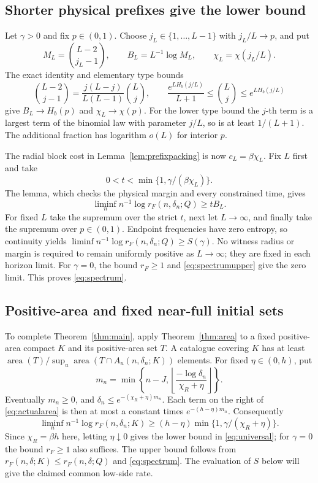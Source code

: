 \documentclass[11pt]{amsart}
\theoremstyle{definition}
\theoremstyle{remark}
\newcommand{\area}{\operatorname{area}}
\numberwithin{equation}{section}
\begin{document}
\subsection{Shorter physical prefixes give the lower bound}
Let $\gamma>0$ and fix $p\in(0,1)$.
Choose $j_L\in\{1,\ldots,L-1\}$ with $j_L/L\to p$, and put
\[
M_L=\binom{L-2}{j_L-1},\qquad
B_L=L^{-1}\log M_L,\qquad \chi_L=\chi(j_L/L).
\]
The exact identity and elementary type bounds
\[
\binom{L-2}{j-1}=\frac{j(L-j)}{L(L-1)}\binom Lj,\qquad
\frac{e^{LH_b(j/L)}}{L+1}\le\binom Lj\le e^{LH_b(j/L)}
\]
give $B_L\to H_b(p)$ and $\chi_L\to\chi(p)$.
For the lower type bound the $j$-th term is a largest term of
the binomial law with parameter $j/L$, so is at least $1/(L+1)$.
The additional fraction has logarithm $o(L)$ for interior $p$.

The radial block cost in Lemma~\ref{lem:prefixpacking} is now
$c_L=\beta\chi_L$. Fix $L$ first and take
\begin{equation}\label{eq:prefixratio}
0<t<\min\{1,\gamma/(\beta\chi_L)\}.
\end{equation}
The lemma, which checks the physical margin and every constrained
time, gives
\begin{equation}\label{eq:prefixlower}
\liminf_n n^{-1}\log r_F(n,\delta_n;Q)\ge tB_L.
\end{equation}
For fixed $L$ take the supremum over the strict $t$, next let
$L\to\infty$, and finally take the supremum over $p\in(0,1)$.
Endpoint frequencies have zero entropy, so continuity yields
$\liminf n^{-1}\log r_F(n,\delta_n;Q)\ge S(\gamma)$.
No witness radius or margin is required to remain uniformly positive
as $L\to\infty$; they are fixed in each horizon limit.
For $\gamma=0$, the bound $r_F\ge1$ and
\eqref{eq:spectrumupper} give the zero limit.
This proves \eqref{eq:spectrum}.

\subsection{Positive-area and fixed near-full initial sets}
To complete Theorem~\ref{thm:main}, apply Theorem~\ref{thm:area}
to a fixed positive-area compact $K$ and its positive-area set $T$.
A catalogue covering $K$ has at least
$\area(T)/\sup_u\area(T\cap A_u(n,\delta_n;K))$ elements.
For fixed $\eta\in(0,h)$, put
\[
m_n=\min\left\{n-J,
 \left\lfloor\frac{-\log\delta_n}{\chi_R+\eta}\right\rfloor\right\}.
\]
Eventually $m_n\ge0$, and
$\delta_n\le e^{-(\chi_R+\eta)m_n}$.
Each term on the right of \eqref{eq:actualarea} is then at most
a constant times $e^{-(h-\eta)m_n}$. Consequently
\[
\liminf_n n^{-1}\log r_F(n,\delta_n;K)
 \ge (h-\eta)\min\{1,\gamma/(\chi_R+\eta)\}.
\]
Since $\chi_R=\beta h$ here, letting $\eta\downarrow0$
gives the lower bound in
\eqref{eq:universal}; for $\gamma=0$ the bound $r_F\ge1$
also suffices. The upper bound follows from
$r_F(n,\delta;K)\le r_F(n,\delta;Q)$ and
\eqref{eq:spectrum}. The evaluation of $S$ below will give
the claimed common low-side rate.
\end{document}
